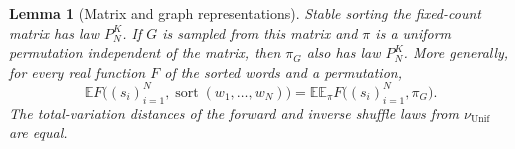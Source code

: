 \documentclass[11pt]{article}
\numberwithin{equation}{section}
\newtheorem{lemma}[theorem]{Lemma}
\theoremstyle{definition}
\theoremstyle{remark}
\newcommand{\E}{\mathbb E}
\newcommand{\Unif}{\mathrm{Unif}}
\newcommand{\nuUnif}{\nu_{\Unif}}
\newcommand{\1}{\mathbf 1}
\begin{document}
\begin{lemma}[Matrix and graph representations]%
\label{lem:matrix-graph}
Stable sorting the fixed-count matrix has law $P_N^K$. If $G$ is
sampled from this matrix and $\pi$ is a uniform permutation independent
of the matrix, then $\pi_G$ also has law $P_N^K$. More generally,
for every real function $F$ of the sorted words and a permutation,
\[
 \E F\bigl((s_i)_{i=1}^N,\operatorname{sort}(w_1,\ldots,w_N)\bigr)
 =\E\E_\pi F\bigl((s_i)_{i=1}^N,\pi_G\bigr).
\]
The total-variation distances of the forward and inverse shuffle
laws from $\nuUnif$ are equal.
\end{lemma}
\end{document}
